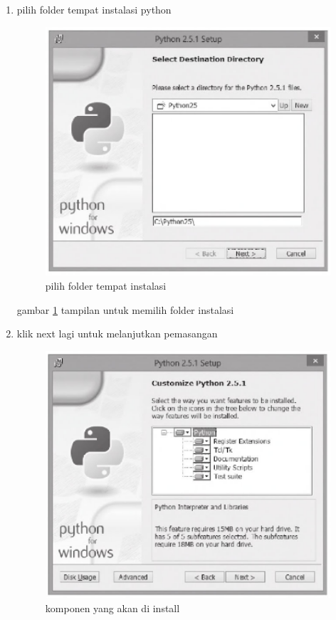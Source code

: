 \begin {enumerate}
	\item
	pilih folder tempat instalasi python
	
	\begin{figure}[ht]
	\centerline{\includegraphics[width=1\textwidth]{figures/folder.PNG}}
	\caption{pilih folder tempat instalasi}
	\label{folder}
	\end{figure}
	
	gambar \ref {folder} tampilan untuk memilih folder instalasi

	\item
	klik next lagi untuk melanjutkan pemasangan

	\begin{figure}[ht]
	\centerline{\includegraphics[width=1\textwidth]{figures/komponen.PNG}}
	\caption{komponen yang akan di install}
	\label{komponen}
	\end{figure}
	

\end{enumerate}
